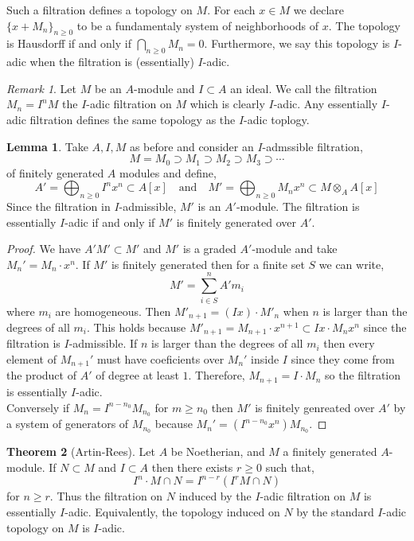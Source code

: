 \documentclass[12pt]{article}
\theoremstyle{remark}
\newtheorem*{remark}{Remark}
\theoremstyle{definition}
\newtheorem{theorem}{Theorem}[section]
\newtheorem{lemma}[theorem]{Lemma}
\newenvironment{definition}[1][Definition:]{\begin{trivlist}
\item[\hskip \labelsep {\bfseries #1}]}{\end{trivlist}}
\begin{document}
\begin{definition}
Such a filtration defines a topology on $M$. For each $x \in M$ we declare $\{ x + M_n \}_{n \ge 0}$ to be a fundamentaly system of neighborhoods of $x$. The topology is Hausdorff if and only if $\bigcap\limits_{n \ge 0} M_n = 0$. Furthermore, we say this topology is $I$-adic when the filtration is (essentially) $I$-adic. 
\end{definition}


\begin{remark}
Let $M$ be an $A$-module and $I \subset A$ an ideal. We call the filtration $M_n = I^n M$ the $I$-adic filtration on $M$ which is clearly $I$-adic. Any essentially $I$-adic filtration defines the same topology as the $I$-adic toplogy. 
\end{remark}


\begin{lemma}
Take $A, I, M$ as before and consider an $I$-admssible filtration,
\[ M = M_0 \supset M_1 \supset M_2 \supset M_3 \supset \cdots \]  
of finitely generated $A$ modules and define,
\[ A' = \bigoplus_{n \ge 0} I^n x^n \subset A[x] \quad \text{and} \quad M' = \bigoplus_{n \ge 0} M_n x^n \subset M \otimes_A A[x]\]
Since the filtration in $I$-admissible, $M'$ is an $A'$-module. The filtration is essentially $I$-adic if and only if $M'$ is finitely generated over $A'$.
\end{lemma}

\begin{proof}
We have $A' M' \subset M'$ and $M'$ is a graded $A'$-module and take $M_n' = M_n \cdot x^n$. If $M'$ is finitely generated then for a finite set $S$ we can write,
\[ M' = \sum_{i \in S }^n A' m_i \]
where $m_i$ are homogeneous. Then $M'_{n+1} = (I x) \cdot M'_n$ when $n$ is larger than the degrees of all $m_i$. This holds because $M'_{n+1} = M_{n+1} \cdot x^{n+1} \subset Ix \cdot M_n x^n$ since the filtration is $I$-admissible. If $n$ is larger than the degrees of all $m_i$ then every element of $M_{n+1}'$ must have coeficients over $M_{n}'$ inside $I$ since they come from the product of $A'$ of degree at least $1$. Therefore, $M_{n+1} = I \cdot M_n$ so the filtration is essentially $I$-adic.
\bigskip\\
Conversely if $M_n = I^{n - n_0} M_{n_0}$ for $m \ge n_0$ then $M'$ is finitely genreated over $A'$ by a system of generators of $M_{n_0}$ because $M_n' = (I^{n - n_0} x^n) M_{n_0}$.  
\end{proof}

\begin{theorem}[Artin-Rees]
Let $A$ be Noetherian, and $M$ a finitely generated $A$-module. If $N \subset M$ and $I \subset A$ then there exists $r \ge 0$ such that,
\[ I^n \cdot M \cap N = I^{n - r} \left( I^r M \cap N \right) \]
for $n \ge r$. Thus the filtration on $N$ induced by the $I$-adic filtration on $M$ is essentially $I$-adic. Equivalently, the topology induced on $N$ by the standard $I$-adic topology on $M$ is $I$-adic. 
\end{theorem}
\end{document}
